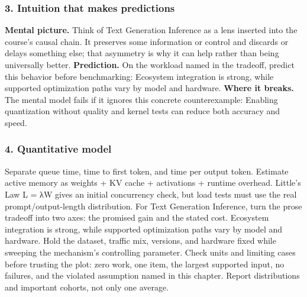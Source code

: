 \subsubsection*{3. Intuition that makes predictions}
\textbf{Mental picture.} Think of Text Generation Inference as a lens inserted into the course's causal chain. It preserves some information or control and discards or delays something else; that asymmetry is why it can help rather than being universally better.
\textbf{Prediction.} On the workload named in the tradeoff, predict this behavior before benchmarking: Ecosystem integration is strong, while supported optimization paths vary by model and hardware.
\textbf{Where it breaks.} The mental model fails if it ignores this concrete counterexample: Enabling quantization without quality and kernel tests can reduce both accuracy and speed.
\subsubsection*{4. Quantitative model}
Separate queue time, time to first token, and time per output token. Estimate active memory as weights + KV cache + activations + runtime overhead. Little's Law L = λW gives an initial concurrency check, but load tests must use the real prompt/output-length distribution.
For Text Generation Inference, turn the prose tradeoff into two axes: the promised gain and the stated cost. Ecosystem integration is strong, while supported optimization paths vary by model and hardware. Hold the dataset, traffic mix, versions, and hardware fixed while sweeping the mechanism's controlling parameter.
Check units and limiting cases before trusting the plot: zero work, one item, the largest supported input, no failures, and the violated assumption named in this chapter. Report distributions and important cohorts, not only one average.
